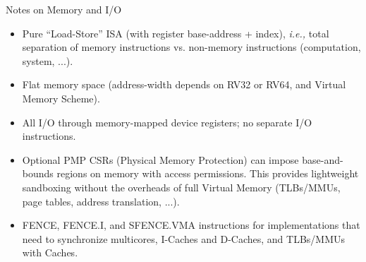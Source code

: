 \documentclass{article}
\newcommand{\ie}{\emph{i.e.,}}
\begin{document}
\clearpage


\begin{center}
  {\Huge
    Notes on Memory and I/O}

  \vspace{1in}

  \begin{minipage}{10in}\LARGE
    \begin{itemize}

    \item Pure ``Load-Store'' ISA (with register base-address +
      index), {\ie} total separation of memory instructions
      vs. non-memory instructions (computation, system, ...).

    \item Flat memory space (address-width depends on RV32 or RV64, and Virtual Memory Scheme).

    \item All I/O through memory-mapped device registers; no separate I/O instructions.

    \item Optional PMP CSRs (Physical Memory Protection) can impose
      base-and-bounds regions on memory with access permissions.  This
      provides lightweight sandboxing without the overheads of full
      Virtual Memory (TLBs/MMUs, page tables, address translation, ...).

    \item FENCE, FENCE.I, and SFENCE.VMA instructions for
      implementations that need to synchronize multicores, I-Caches
      and D-Caches, and TLBs/MMUs with Caches.

    \end{itemize}
  \end{minipage}
\end{center}

\clearpage

\end{document}
